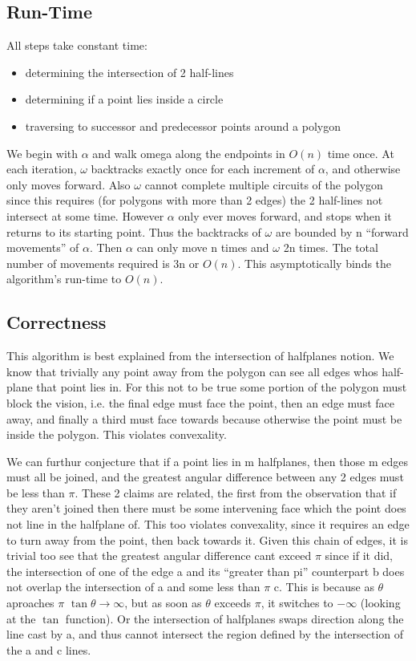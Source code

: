 \subsection{Run-Time}

All steps take constant time:
\begin{itemize}
	\item determining the intersection of 2 half-lines
	\item determining if a point lies inside a circle
	\item traversing to successor and predecessor points around a polygon
\end{itemize}
We begin with $\alpha$ and walk omega along the endpoints in $O(n)$ time once.
At each iteration, $\omega$ backtracks exactly once for each increment of $\alpha$, and otherwise only moves forward.
Also $\omega$ cannot complete multiple circuits of the polygon since this requires (for polygons with more than 2 edges) the 2 half-lines not intersect at some time.
However $\alpha$ only ever moves forward, and stops when it returns to its starting point.
Thus the backtracks of $\omega$ are bounded by n ``forward movements'' of $\alpha$.
Then $\alpha$ can only move n times and $\omega$ 2n times.
The total number of movements required is 3n or $O(n)$.
This asymptotically binds the algorithm's run-time to $O(n)$.

\subsection{Correctness}

This algorithm is best explained from the intersection of halfplanes notion.
We know that trivially any point away from the polygon can see all edges whos half-plane that point lies in.
For this not to be true some portion of the polygon must block the vision, i.e. the final edge must face the point, then an edge must face away, and finally a third must face towards because otherwise the point must be inside the polygon.
This violates convexality.

We can furthur conjecture that if a point lies in m halfplanes, then those m edges must all be joined, and the greatest angular difference between any 2 edges must be less than $\pi$.
These 2 claims are related, the first from the observation that if they aren't joined then there must be some intervening face which the point does not line in the halfplane of.
This too violates convexality, since it requires an edge to turn away from the point, then back towards it.
Given this chain of edges, it is trivial too see that the greatest angular difference cant exceed $\pi$ since if it did, the intersection of one of the edge a and its ``greater than pi'' counterpart b does not overlap the intersection of a and some less than $\pi$ c.
This is because as $\theta$ aproaches $\pi$ $\tan \theta \rightarrow \infty$, but as soon as $\theta$ exceeds $\pi$, it switches to $-\infty$ (looking at the $\tan$ function).
Or the intersection of halfplanes swaps direction along the line cast by a, and thus cannot intersect the region defined by the intersection of the a and c lines.

